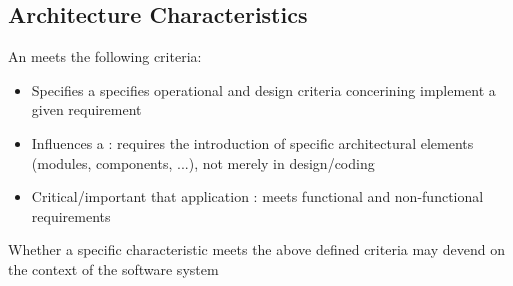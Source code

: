 \subsection{Architecture Characteristics}
\begin{defBox}[title=Architecture Characteristics]
    An  meets the following criteria:
    \begin{itemize}
        \item Specifies a  specifies operational and design criteria concerining  implement a given requirement
        \item Influences a : requires the introduction of specific architectural elements (modules, components, ...), not merely  in design/coding
        \item Critical/important that application : meets functional and non-functional requirements
    \end{itemize}
\end{defBox}
Whether a specific characteristic meets the above defined criteria may devend on the context of the software system
